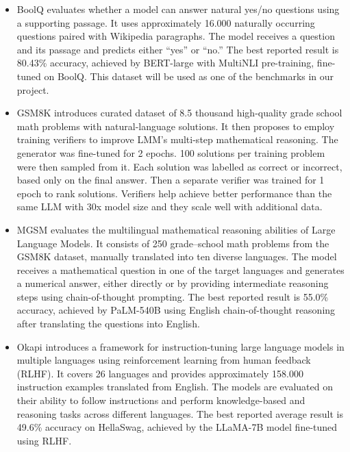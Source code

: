 \documentclass[11pt]{article}
\begin{document}
\begin{itemize}
\item BoolQ \cite{clark2019boolqexploringsurprisingdifficulty} evaluates whether a model can answer natural yes/no questions using a supporting passage. It uses approximately 16.000 naturally occurring questions paired with Wikipedia paragraphs. The model receives a question and its passage and predicts either ``yes'' or ``no.'' The best reported result is 80.43\% accuracy, achieved by BERT-large with MultiNLI pre-training, fine-tuned on BoolQ. This dataset will be used as one of the benchmarks in our project.

\item GSM8K \cite{DBLP:journals/corr/abs-2110-14168} introduces curated dataset of 8.5 thousand high-quality grade school math problems with natural-language solutions. It then proposes to employ training verifiers to improve LMM's multi-step mathematical reasoning. The generator was fine-tuned for 2 epochs. 100 solutions per training problem were then sampled from it. Each solution was labelled as correct or incorrect, based only on the final answer. Then a separate verifier was trained for 1 epoch to rank solutions. Verifiers help achieve better performance than the same LLM with 30x model size and they scale well with additional data.

\item MGSM \cite{shi2022languagemodelsmultilingualchainofthought} evaluates the multilingual mathematical reasoning abilities of Large Language Models. It consists of 250 grade--school math problems from the GSM8K dataset, manually translated into ten diverse languages. The model receives a mathematical question in one of the target languages and generates a numerical answer, either directly or by providing intermediate reasoning steps using chain-of-thought prompting. The best reported result is 55.0\% accuracy, achieved by PaLM-540B using English chain-of-thought reasoning after translating the questions into English.

\item Okapi \cite{lai2023okapiinstructiontunedlargelanguage} introduces a framework for instruction-tuning large language models in multiple languages using reinforcement learning from human feedback (RLHF). It covers 26 languages and provides approximately 158.000 instruction examples translated from English. The models are evaluated on their ability to follow instructions and perform knowledge-based and reasoning tasks across different languages. The best reported average result is 49.6\% accuracy on HellaSwag, achieved by the LLaMA-7B model fine-tuned using RLHF.


\end{itemize}
\end{document}
